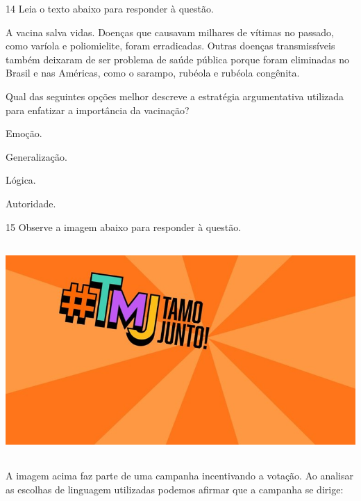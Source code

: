 \num{14} Leia o texto abaixo para responder à questão. 

\begin{myquote}

A vacina salva vidas. Doenças que causavam milhares de vítimas no
passado, como varíola e poliomielite, foram erradicadas. Outras doenças
transmissíveis também deixaram de ser problema de saúde pública porque
foram eliminadas no Brasil e nas Américas, como o sarampo, rubéola e
rubéola congênita.


\end{myquote}

Qual das seguintes opções melhor descreve a estratégia argumentativa
utilizada para enfatizar a importância da vacinação?

\begin{escolha}

    \item Emoção.
    
    \item Generalização.
    
    \item Lógica.
    
    \item Autoridade.

\end{escolha}

\num{15} Observe a imagem abaixo para responder à questão. 

\begin{myquote}

\includegraphics[width=5.90551in,height=3.18056in]{imgSAEB_7_POR/media/image22.png}


A imagem acima faz parte de uma campanha incentivando a votação. Ao analisar
as escolhas de linguagem utilizadas podemos afirmar que a campanha se dirige: 

\end{myquote}

